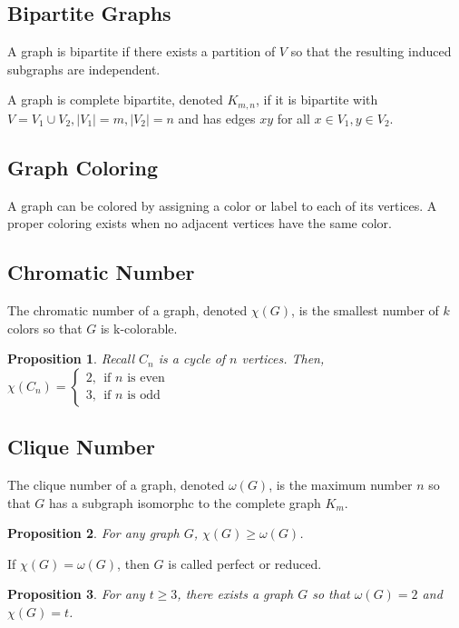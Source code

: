 \documentclass{article}
\newtheorem{proposition}{Proposition}[theorem]
\begin{document}
\subsection{Bipartite Graphs}
A graph is bipartite if there exists a partition of $V$ so that the resulting induced subgraphs are independent.

A graph is complete bipartite, denoted $K_{m,n}$, if it is bipartite with $V = V_1 \cup V_2, |V_1| = m, |V_2|= n$ and has edges $xy$ for all $x \in V_1, y \in V_2$.

\subsection{Graph Coloring}
A graph can be colored by assigning a color or label to each of its vertices. A proper coloring exists when no adjacent vertices have the same color.

\subsection{Chromatic Number}
The chromatic number of a graph, denoted $\chi (G)$, is the smallest number of $k$ colors so that $G$ is k-colorable.

\begin{proposition}
    Recall $C_n$ is a cycle of $n$ vertices. Then, $\chi (C_n) = \begin{cases}
2 ,\ \ \text{if } n \text{ is even} \\
3,\ \  \text{if } n \text{ is odd }
\end{cases}$
\end{proposition}

\subsection{Clique Number}
The clique number of a graph, denoted $\omega(G)$, is the maximum number $n$ so that $G$ has a subgraph isomorphc to the complete graph $K_m$.

\begin{proposition}
    For any graph $G$, $ \chi(G) \geq \omega(G)$.
\end{proposition}

If $ \chi(G) = \omega(G)$, then $G$ is called perfect or reduced.

\begin{proposition}
    For any $t \geq 3$, there exists a graph $G$ so that $\omega(G) = 2$ and $\chi(G) = t$. 
\end{proposition}
\end{document}
